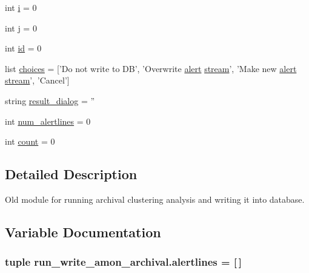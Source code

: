 \begin{DoxyCompactItemize}
int \hyperlink{namespacerun__write__amon__archival_a869ea157d829c6bcdc64d6292b1c3214}{i} = 0
\item 
int \hyperlink{namespacerun__write__amon__archival_a44af312e140e5778b40eff6eceb88a1d}{j} = 0
\item 
int \hyperlink{namespacerun__write__amon__archival_aaa5a8aad3154ef995c44531f8b1ff561}{id} = 0
\item 
list \hyperlink{namespacerun__write__amon__archival_aca6daf5feb21c980a644761c7a0496b4}{choices} = \mbox{[}'Do not write to D\-B', 'Overwrite \hyperlink{db__mc__build_8sql_a38a604686c7d372f50752e893e3e1e21}{alert} \hyperlink{db__mc__build_8sql_a67b7e9fc922cbf49b5ae3124240f4188}{stream}', 'Make new \hyperlink{db__mc__build_8sql_a38a604686c7d372f50752e893e3e1e21}{alert} \hyperlink{db__mc__build_8sql_a67b7e9fc922cbf49b5ae3124240f4188}{stream}', 'Cancel'\mbox{]}
\item 
string \hyperlink{namespacerun__write__amon__archival_ad76510cc1b9a03179b91e7092dc7ae00}{result\-\_\-dialog} = ''
\item 
int \hyperlink{namespacerun__write__amon__archival_a7e253ecbcbf322bb69121f129cefb3ff}{num\-\_\-alertlines} = 0
\item 
int \hyperlink{namespacerun__write__amon__archival_a89f481b3ff8baa3b71ca31b44b67ec47}{count} = 0
\end{DoxyCompactItemize}


\subsection{Detailed Description}
Old module for running archival clustering analysis and writing it into database. 

\subsection{Variable Documentation}
\hypertarget{namespacerun__write__amon__archival_a89d71b1c3dfca6e5a3c8b3576de0ab1c}{
\subsubsection[{alertlines}]{\setlength{\rightskip}{0pt plus 5cm}tuple run\-\_\-write\-\_\-amon\-\_\-archival.\-alertlines = \mbox{[}$\,$\mbox{]}}}\label{namespacerun__write__amon__archival_a89d71b1c3dfca6e5a3c8b3576de0ab1c}


